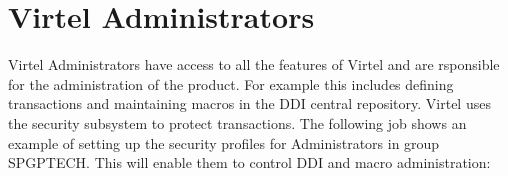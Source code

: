 \documentclass[letterpaper,10pt,english]{sphinxmanual}
\begin{document}
\sphinxAtStartPar
{}

\newpage

\ignorespaces 

\section{Virtel Administrators}
\label{\detokenize{Installation_Guide:virtel-administrators}}\label{\detokenize{Installation_Guide:index-183}}
\sphinxAtStartPar
Virtel Administrators have access to all the features of Virtel and are rsponsible for the administration of the product. For example this includes defining transactions and maintaining macros in the DDI central repository. Virtel uses the security subsystem to protect transactions. The following job shows an example of setting up the security profiles for Administrators in group SPGPTECH. This will enable them to control DDI and macro administration:\sphinxhyphen{}
\end{document}
